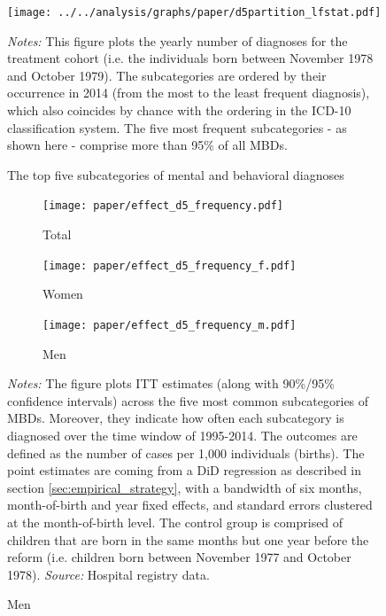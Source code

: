 \documentclass[11pt, a4paper, draft]{article} %
\begin{document}
 
\vspace*{\fill}
\begin{figure}[H]\centering
	\caption{The top five subcategories of mental and behavioral diagnoses}\label{fig: d5partition}
	\texttt{[image: ../../analysis/graphs/paper/d5partition\_lfstat.pdf]}
	\scriptsize
	\begin{minipage}{0.9\linewidth}
	\emph{Notes:} This figure plots the yearly number of diagnoses for the treatment cohort (i.e. the individuals born between November 1978 and October 1979). The subcategories are ordered by their occurrence in 2014 (from the most to the least frequent diagnosis), which also coincides by chance with the ordering in the ICD-10 classification system. The five most frequent subcategories - as shown here - comprise more than 95\% of all MBDs. 
	\end{minipage}
\end{figure}
\vspace*{\fill}\clearpage%
\begin{landscape}
	\vspace*{\fill}
	\begin{figure}
		[H]\centering
		\caption{ITT effect for \textbf{subcategories of mental and behavioral disorders (pooled)}}\label{fig: ITT_d5_subcategories}
		\begin{subfigure}[h]{0.31\linewidth}\centering\caption{Total}
			\texttt{[image: paper/effect\_d5\_frequency.pdf]}
		\end{subfigure}
		\begin{subfigure}[h]{0.31\linewidth}\centering\caption{Women}
			\texttt{[image: paper/effect\_d5\_frequency\_f.pdf]}
		\end{subfigure}
		\begin{subfigure}[h]{0.31\linewidth}\centering\caption{Men}
			\texttt{[image: paper/effect\_d5\_frequency\_m.pdf]}
		\end{subfigure}
		\scriptsize
		\begin{minipage}{0.95\linewidth}
			\emph{Notes:} The figure plots ITT estimates (along with 90\%/95\% confidence intervals) across the five most common subcategories of MBDs. Moreover, they indicate how often each subcategory is diagnosed over the time window of 1995-2014. The outcomes are defined as the number of cases per 1,000 individuals (births). The point estimates are coming from a DiD regression as described in section \ref{sec:empirical_strategy}, with a bandwidth of six months, month-of-birth and year fixed effects, and standard errors clustered at the month-of-birth level. The control group is comprised of children that are born in the same months but one year before the reform (i.e. children born between November 1977 and October 1978).\newline
			\emph{Source:} Hospital registry data.
		\end{minipage}
	\end{figure}
	\vspace*{\fill}\clearpage
\end{landscape}
\end{document}
